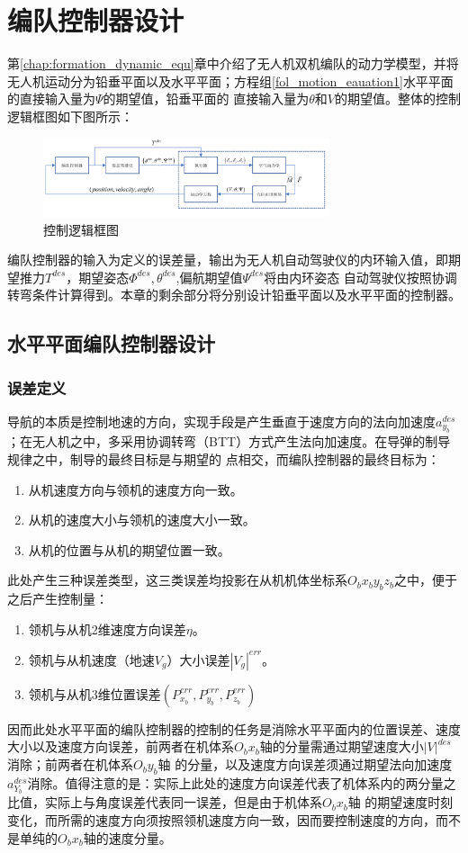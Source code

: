 \chapter{编队控制器设计}
\label{chap:controller_design}
第\ref{chap:formation_dynamic_equ}章中介绍了无人机双机编队的动力学模型，并将无人机运动分为铅垂平面以及水平平面；方程组\ref{fol_motion_eauation1}水平平面的直接输入量为$\Psi$的期望值，铅垂平面的
直接输入量为$\theta$和$V$的期望值。整体的控制逻辑框图如下图所示：
\begin{figure}[H]
    \centering
    \includegraphics[width=0.75\textwidth]{figures/c3/c3-overview_controller.png}
    \caption{控制逻辑框图}\label{fig:c3-overview_controller}
\end{figure}
编队控制器的输入为定义的误差量，输出为无人机自动驾驶仪的内环输入值，即期望推力$T^{des}$，期望姿态$\Phi^{des},\theta^{des}$,偏航期望值$\Psi^{des}$将由内环姿态
自动驾驶仪按照协调转弯条件计算得到。本章的剩余部分将分别设计铅垂平面以及水平平面的控制器。
\section{水平平面编队控制器设计}
\subsection{误差定义}
导航的本质是控制地速的方向，实现手段是产生垂直于速度方向的法向加速度$a_{y_b}^{des}$；在无人机之中，多采用协调转弯（BTT）方式产生法向加速度。在导弹的制导规律之中，制导的最终目标是与期望的
点相交，而编队控制器的最终目标为：
\begin{enumerate}
    \item 从机速度方向与领机的速度方向一致。
    \item 从机的速度大小与领机的速度大小一致。
    \item 从机的位置与从机的期望位置一致。
\end{enumerate}
此处产生三种误差类型，这三类误差均投影在从机机体坐标系$O_bx_by_bz_b$之中，便于之后产生控制量：
\begin{enumerate}
    \item 领机与从机2维速度方向误差$\eta$。%
    \item 领机与从机速度（地速$V_g$）大小误差$|V_g|^{err}$。
    \item 领机与从机3维位置误差$(P_{x_b}^{err},P_{y_b}^{err},P_{z_b}^{err})$
\end{enumerate}
因而此处水平平面的编队控制器的控制的任务是消除水平平面内的位置误差、速度大小以及速度方向误差，前两者在机体系$O_bx_b$轴的分量需通过期望速度大小${|V|}^{des}$消除；前两者在机体系$O_by_b$轴
的分量，以及速度方向误差须通过期望法向加速度$a_{Y_b}^{des}$消除。值得注意的是：实际上此处的速度方向误差代表了机体系内的两分量之比值，实际上与角度误差代表同一误差，但是由于机体系$O_bx_b$轴
的期望速度时刻变化，而所需的速度方向须按照领机速度方向一致，因而要控制速度的方向，而不是单纯的$O_bx_b$轴的速度分量。
